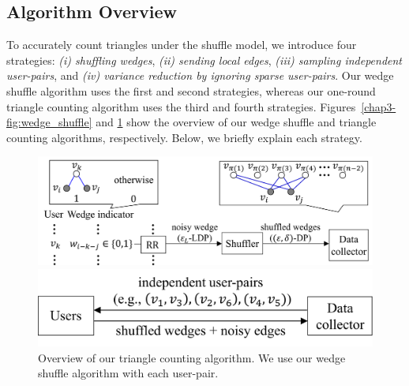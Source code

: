 \subsection{Algorithm Overview}
\label{chap3-sub:triangle_overview}
To accurately count triangles under the shuffle model, 
we introduce four 
strategies: 
\textit{(i) shuffling wedges}, 
\textit{(ii) sending local edges}, 
\textit{(iii) sampling independent user-pairs}, 
and 
\textit{(iv) variance reduction by ignoring sparse user-pairs}. 
Our wedge shuffle algorithm uses the first and second strategies, whereas our one-round triangle counting algorithm uses the 
third and fourth strategies. 
Figures~\ref{chap3-fig:wedge_shuffle} and \ref{chap3-fig:triangle_count} show the overview of 
our wedge shuffle and triangle counting algorithms, respectively. 
Below, we briefly explain each strategy. 

\begin{figure}[t]
  \centering
  \includegraphics[width=0.99\linewidth]{fig/wedge_shuffle.pdf}
  
  \caption{Overview of our wedge shuffle algorithm with inputs $v_i$ and $v_j$. 
  }
  \label{chap3-fig:wedge_shuffle}
\vspace{2mm}
  \centering
  \includegraphics[width=0.7\linewidth]{fig/triangle_count.pdf}
  
  \caption{Overview of our triangle counting algorithm. 
  We use our wedge shuffle algorithm with each user-pair.
  }
  \label{chap3-fig:triangle_count}
\end{figure}

